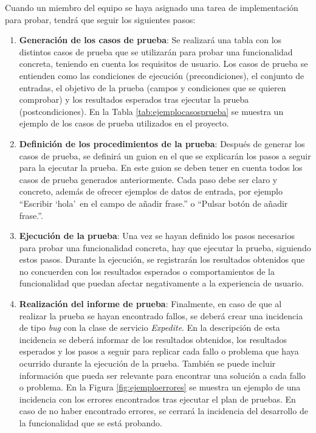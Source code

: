 Cuando un miembro del equipo se haya asignado una tarea de implementación para probar, tendrá que seguir los siguientes pasos:
\begin{enumerate}
  \item \textbf{Generación de los casos de prueba}: Se realizará una tabla con los distintos casos de prueba que se utilizarán para probar una funcionalidad concreta, teniendo en cuenta los requisitos de usuario. Los casos de prueba se entienden como las condiciones de ejecución (precondiciones), el conjunto de entradas, el objetivo de la prueba (campos y condiciones que se quieren comprobar) y los resultados esperados tras ejecutar la prueba (postcondiciones). En la Tabla \ref{tab:ejemplocasosprueba} se muestra un ejemplo de los casos de prueba utilizados en el proyecto.
  \item \textbf{Definición de los procedimientos de la prueba}: Después de generar los casos de prueba, se definirá un guion en el que se explicarán los pasos a seguir para la ejecutar la prueba. En este guion se deben tener en cuenta todos los casos de prueba generados anteriormente. Cada paso debe ser claro y concreto, además de ofrecer ejemplos de datos de entrada, por ejemplo ``Escribir `hola'\, en el campo de añadir frase.'' o ``Pulsar botón de añadir frase.''.
  \item \textbf{Ejecución de la prueba}: Una vez se hayan definido los pasos necesarios para probar una funcionalidad concreta, hay que ejecutar la prueba, siguiendo estos pasos. Durante la ejecución, se registrarán los resultados obtenidos que no concuerden con los resultados esperados o comportamientos de la funcionalidad que puedan afectar negativamente a la experiencia de usuario.
  \item \textbf{Realización del informe de prueba}: Finalmente, en caso de que al realizar la prueba se hayan encontrado fallos, se deberá crear una incidencia de tipo \textit{bug} con la clase de servicio \textit{Expedite}. En la descripción de esta incidencia se deberá informar de los resultados obtenidos, los resultados esperados y los pasos a seguir para replicar cada fallo o problema que haya ocurrido durante la ejecución de la prueba. También se puede incluir información que pueda ser relevante para encontrar una solución a cada fallo o problema. En la Figura \ref{fig:ejemploerrores} se muestra un ejemplo de una incidencia con los errores encontrados tras ejecutar el plan de pruebas. En caso de no haber encontrado errores, se cerrará la incidencia del desarrollo de la funcionalidad que se está probando.
\end{enumerate}

